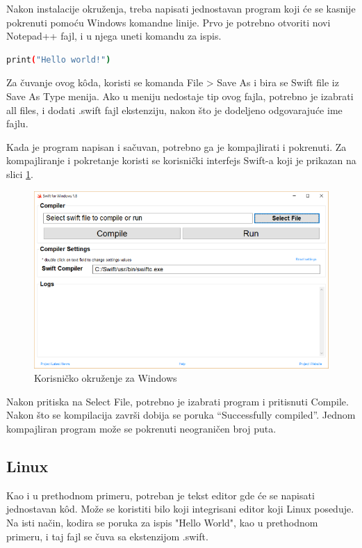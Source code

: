 \documentclass[a4paper]{article}
\begin{document}
Nakon instalacije okruženja, treba napisati jednostavan program koji će se kasnije pokrenuti pomoću Windows komandne linije. Prvo je potrebno otvoriti novi Notepad++ fajl, i u njega uneti komandu za ispis.

\begin{lstlisting}[language=bash, caption={Primer komande}]
print("Hello world!")
\end{lstlisting}

Za čuvanje ovog k\^{o}da, koristi se komanda File > Save As i bira se Swift file iz Save As Type menija. Ako u meniju nedostaje tip ovog fajla, potrebno je izabrati all files, i dodati .swift fajl ekstenziju, nakon što je dodeljeno odgovarajuće ime fajlu.

Kada je program napisan i sačuvan, potrebno ga je kompajlirati i pokrenuti. Za kompajliranje i pokretanje koristi se korisnički interfejs Swift-a koji je prikazan na slici \ref{fig:windows}.

\begin{figure}[h!]
\begin{center}
\includegraphics[scale=0.27]{swift-win.png}
\end{center}
\caption{Korisničko okruženje za Windows}
\label{fig:windows}
\end{figure}

Nakon pritiska na Select File, potrebno je izabrati program i pritisnuti Compile. Nakon što se kompilacija završi dobija se poruka “Successfully compiled”.
Jednom kompajliran program može se pokrenuti neograničen broj puta.

\subsection{Linux}
\label{subsec:podnaslovLinux}
Kao i u prethodnom primeru, potreban je tekst editor gde će se napisati jednostavan k\^{o}d.
Može se koristiti bilo koji integrisani editor koji Linux poseduje. Na isti način, kodira se poruka za ispis "Hello World", kao u prethodnom primeru, i taj fajl se čuva sa ekstenzijom .swift.
\end{document}
